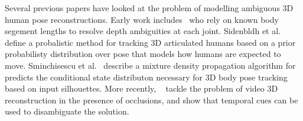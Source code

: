 




Several previous papers have looked at the problem of modelling ambiguous 3D human pose reconstructions. Early work includes~\cite{kinematic-jump-processes} who rely on known body segement lengths to resolve depth ambiguities at each joint. Sidenbldh et al.~\cite{tracking-3d-human-figures} define a probalistic method for tracking 3D articulated humans based on a prior probabilisty distribution over pose that models how humans are expected to move. Sminchisescu et al.~\cite{density-prop} describe a mixture density propagation algorithm for predicts the conditional state distributon necessary for 3D body pose tracking based on input silhouettes. More recently, ~\cite{cheng19occlusion-aware} tackle the problem of video 3D reconstruction in the presence of occlusions, and show that temporal cues can be used to disambiguate the solution. 



